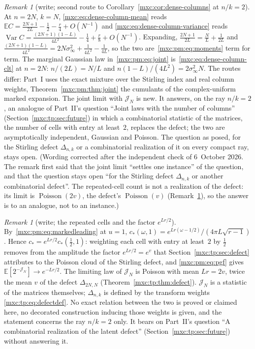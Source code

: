 \documentclass[11pt]{article}
\numberwithin{equation}{section}
\theoremstyle{definition}
\theoremstyle{remark}
\newtheorem{remark}[theorem]{Remark}
\newcommand{\E}{\mathbb E}
\DeclareMathOperator{\Pois}{Poisson}
\DeclareMathOperator{\Var}{Var}
\begin{document}
\begin{remark}[write; second route to Corollary~\ref{mxc:cor:dense-columns} at $n/k=2$]\label{mxc:pm:rem:columns}
At $n=2N$, $k=N$, \eqref{mxc:eq:dense-column-mean} reads
$\E C=\frac{2N+1}{2L}-\frac12-\frac r4+O(N^{-1})$ and
\eqref{mxc:eq:dense-column-variance} reads
$\Var C=\frac{(2N+1)(1-L)}{4L^2}-\frac14+\frac r8+O(N^{-1})$. Expanding,
$\frac{2N+1}{2L}=\frac NL+\frac1{2L}$ and
$\frac{(2N+1)(1-L)}{4L^2}=2N\sigma_\infty^2+\frac1{4L^2}-\frac1{4L}$, so the two
are~\eqref{mxc:pm:eq:moments} term for term. The marginal Gaussian law
in~\eqref{mxc:pm:eq:joint} is~\eqref{mxc:eq:dense-column-clt} at $n=2N$:
$n/(2L)=N/L$ and $n(1-L)/(4L^2)=2\sigma_\infty^2N$. The routes differ: Part~I
uses the exact mixture over the Stirling index and real column weights,
Theorem~\ref{mxc:pm:thm:joint} the cumulants of the complex-uniform marked
expansion. The joint limit with $\mathcal J_N$ is new. It answers, on the ray $n/k=2$,
an analogue of Part~II's question ``Joint laws with the number of columns''
(Section~\ref{mxc:tp:sec:future}) in which a combinatorial statistic of the
matrices, the number of cells with entry at least~$2$, replaces the defect;
the two are asymptotically independent, Gaussian and Poisson. The question as
posed, for the Stirling defect $\Delta_{n,k}$ or a combinatorial realization
of it on every compact ray, stays open. \textup{(Wording corrected after the
independent check of 6~October 2026. The remark first said that the joint
limit ``settles one instance'' of the question, and that the question stays
open ``for the Stirling defect $\Delta_{n,k}$ or another combinatorial
defect''. The repeated-cell count is not a realization of the defect: its
limit is $\Pois(2v)$, the defect's $\Pois(v)$ (Remark~\ref{mxc:pm:rem:defect}),
so the answer is to an analogue, not to an instance.)}
\end{remark}

\begin{remark}[write; the repeated cells and the factor $e^{Lr/2}$]\label{mxc:pm:rem:defect}
By~\eqref{mxc:pm:eq:markedleading} at $u=1$,
$c_*(\omega,1)=e^{Lr(\omega-1/2)}/(4\pi L\sqrt{r-1})$. Hence
$c_*=e^{Lr/2}c_*(\tfrac12,1)$: weighting each cell with entry at least~$2$
by $\frac12$ removes from the amplitude the factor $e^{Lr/2}=e^v$ that
Section~\ref{mxc:tp:sec:defect} attributes to the Poisson cloud of the
Stirling defect, and \eqref{mxc:pm:eq:pgf} gives
$\E[2^{-\mathcal J_N}]\to e^{-Lr/2}$. The limiting law of $\mathcal J_N$ is
Poisson with mean $Lr=2v$, twice the mean $v$ of the defect
$\Delta_{2N,N}$ (Theorem~\ref{mxc:tp:thm:defect}). $\mathcal J_N$ is a statistic of
the matrices themselves; $\Delta_{n,k}$ is defined by the transform weights
\eqref{mxc:tp:eq:defectdef}. No exact relation between the two is proved or
claimed here, no decorated construction inducing those weights is given, and
the statement concerns the ray $n/k=2$ only. It bears on Part~II's question
``A combinatorial realization of the latent defect''
(Section~\ref{mxc:tp:sec:future}) without answering it.
\end{remark}
\end{document}
